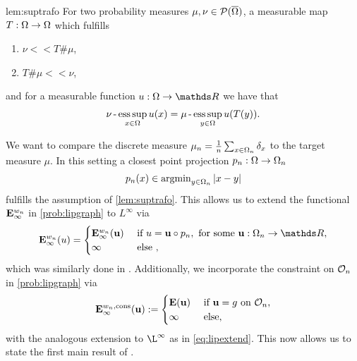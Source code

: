 %
\begin{lemma}{\cite[Lem. 2]{roith2022continuum}}{lem:suptrafo}
For two probability measures $\mu,\nu \in \mathcal{P}(\overline{\Omega})$, a measurable map 
$T:\Omega\rightarrow\Omega$ which fulfills
\begin{enumerate}[label=\upshape(\roman*)]
\item $\nu<<T\#\mu$,
\item $T\# \mu<<\nu$,
\end{enumerate}
and for a measurable function $u:\domain\rightarrow\R$ we have that
\begin{align*}
\nu\operatorname{-}\operatorname*{ess\,sup}_{x\in\Omega} u(x) = \mu\operatorname{-}\operatorname*{ess\,sup}_{y\in\Omega} u(T(y)).
\end{align*}
\end{lemma}
%
%
We want to compare the discrete measure $\mu_n = \frac{1}{n}\sum_{x\in\Omega_n} \delta_x$ to the target measure $\mu$. In this setting a closest point projection $p_n:\Omega\to\Omega_n$
%
\begin{align*}
p_n(x) \in \operatorname{argmin}_{y\in\Omega_n} \left|x- y\right|
\end{align*}
%
fulfills the assumption of \cref{lem:suptrafo}. This allows us to extend the functional $\mathbf{E}^{w_n}_\infty$ in \cref{prob:lipgraph} to $L^\infty$ via
%
\begin{align}\label{eq:lipextend}
\GE^{w_n}_\infty(u) = 
%
\begin{cases}
\GE^{w_n}_\infty(\vec u) &\text{ if } u=\vec u \circ p_n,\text{ for some } \vec u :\domain_n\to\R,\\
\infty &\text{ else },
\end{cases}
\end{align}
%
which was similarly done in \cite{GarcSlep15, slepcev2019analysis}. Additionally, we incorporate the constraint on $\mathcal{O}_n$ in \cref{prob:lipgraph} via
%
\begin{align*}
\mathbf{E}^{w_n, \text{cons}}_\infty (\mathbf{u}):=
\begin{cases}
\mathbf{E}(\mathbf{u})&\text{ if } \mathbf{u} = g \text{ on } \mathcal{O}_n,\\
\infty &\text{ else},
\end{cases}
\end{align*}
%
with the analogous extension to $\L^\infty$ as in \cref{eq:lipextend}.
%
This now allows us to state the first main result of \cite{roith2022continuum}.


